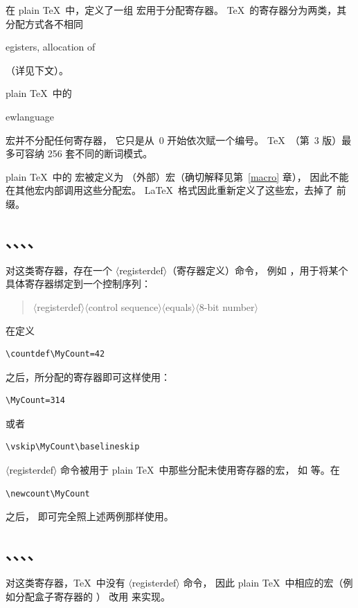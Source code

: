\documentclass[a4paper]{rapport3}
\makeatletter
\def\gr#1{$\langle$#1$\rangle$}\def\key#1{{\tt#1}}
\newenvironment{Disp}{\begin{quotation}}{\end{quotation}}
\def\term#1\par{\index{#1}}
\def\cstoidx#1\par{\index{#1@\cs{#1}}}
\def\csidx#1{\cstoidx #1\par\cs{#1}}
\makeatother
\begin{document}
在 plain \TeX\ 中，定义了一组  宏用于分配寄存器。
\TeX\ 的寄存器分为两类，其分配方式各不相同
\term registers, allocation of\par
（详见下文）。

plain \TeX\ 中的 \csidx{newlanguage} 宏并不分配任何寄存器，
它只是从~0 开始依次赋一个编号。
\TeX\ （第~3 版）最多可容纳 256 套不同的断词模式。

plain \TeX\ 中的  宏被定义为 （外部）宏（确切解释见第~\ref{macro} 章），
因此不能在其他宏内部调用这些分配宏。
\LaTeX\ 格式因此重新定义了这些宏，去掉了  前缀。

\subsection{、、、、}

对这类寄存器，存在一个 \gr{registerdef}（寄存器定义）命令，
例如 ，用于将某个具体寄存器绑定到一个控制序列：
\begin{Disp}\gr{registerdef}\gr{control 
    sequence}\gr{equals}\gr{8-bit number}\end{Disp}

在定义 \begin{verbatim}
\countdef\MyCount=42
\end{verbatim}
之后，所分配的寄存器即可这样使用：
\begin{verbatim}
\MyCount=314
\end{verbatim}
或者 \begin{verbatim}
\vskip\MyCount\baselineskip
\end{verbatim}

\gr{registerdef} 命令被用于 plain \TeX\ 中那些分配未使用寄存器的宏，
如  等。在\begin{verbatim}
\newcount\MyCount
\end{verbatim}
之后， 即可完全照上述两例那样使用。

\subsection{、、、、}

对这类寄存器，\TeX\ 中没有 \gr{registerdef} 命令，
因此 plain \TeX\ 中相应的宏（例如分配盒子寄存器的 ）
改用  来实现。
\end{document}
